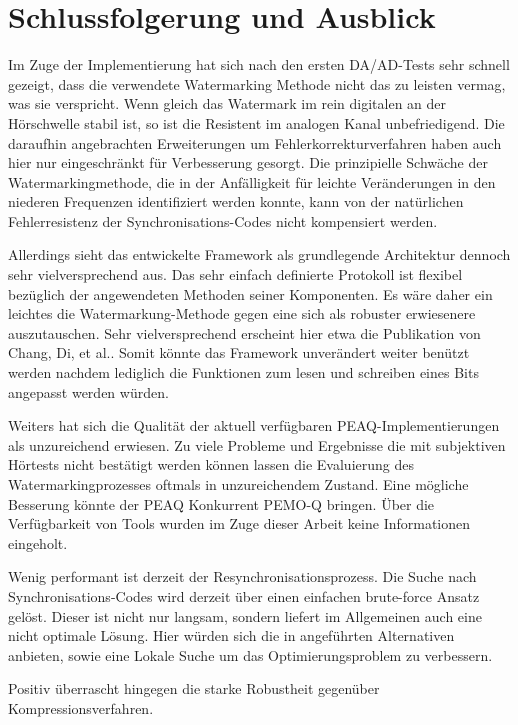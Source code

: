 \chapter{Schlussfolgerung und Ausblick}
\label{ch:ausblick}

Im Zuge der Implementierung hat sich nach den ersten DA/AD-Tests sehr schnell gezeigt, dass die verwendete Watermarking Methode\cite{xiang2007robust} nicht das zu leisten vermag, was sie verspricht. Wenn gleich das Watermark im rein digitalen an der Hörschwelle stabil ist, so ist die Resistent im analogen Kanal unbefriedigend. Die daraufhin angebrachten Erweiterungen um Fehlerkorrekturverfahren haben auch hier nur eingeschränkt für Verbesserung gesorgt. Die prinzipielle Schwäche der Watermarkingmethode, die in der Anfälligkeit für leichte Veränderungen in den niederen Frequenzen identifiziert werden konnte, kann von der natürlichen Fehlerresistenz der Synchronisations-Codes nicht kompensiert werden.

Allerdings sieht das entwickelte Framework als grundlegende Architektur dennoch sehr vielversprechend aus. Das sehr einfach definierte Protokoll ist flexibel bezüglich der angewendeten Methoden seiner Komponenten. Es wäre daher ein leichtes die Watermarkung-Methode gegen eine sich als robuster erwiesenere auszutauschen. Sehr vielversprechend erscheint hier etwa die Publikation von Chang, Di, et al.\cite{chang2012location}. Somit könnte das Framework unverändert weiter benützt werden nachdem lediglich die Funktionen zum lesen und schreiben eines Bits angepasst werden würden. 

Weiters hat sich die Qualität der aktuell verfügbaren PEAQ-Implementierungen als unzureichend erwiesen. Zu viele Probleme und Ergebnisse die mit subjektiven Hörtests nicht bestätigt werden können lassen die Evaluierung des Watermarkingprozesses oftmals in unzureichendem Zustand. Eine mögliche Besserung könnte der PEAQ Konkurrent PEMO-Q\cite{huber2006pemo} bringen. Über die Verfügbarkeit von Tools wurden im Zuge dieser Arbeit keine Informationen eingeholt. 

Wenig performant ist derzeit der Re\-synchron\-isations\-prozess. Die Suche nach Synchron\-isations-Codes wird derzeit über einen einfachen brute-force Ansatz gelöst. Dieser ist nicht nur langsam, sondern liefert im Allgemeinen auch eine nicht optimale Lösung. Hier würden sich die in \cite{steinebach2011re} angeführten Alternativen anbieten, sowie eine Lokale Suche um das Optimierungs\-problem zu verbessern. 

Positiv überrascht hingegen die starke Robustheit gegenüber Kompressionsverfahren.